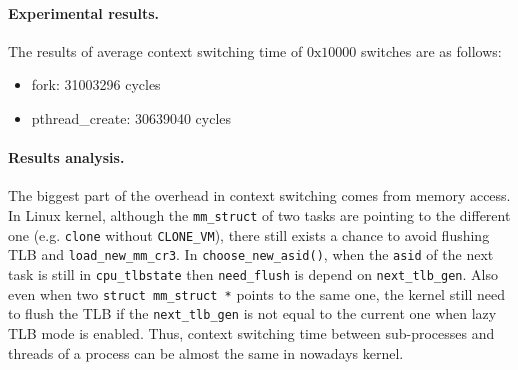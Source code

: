 \paragraph{Experimental results.}
The results of average context switching time of $0\text{x}10000$ switches are as follows:
\begin{itemize}[leftmargin=*]
	\item fork: 31003296 cycles
	\item pthread\_create: 30639040 cycles
\end{itemize}

\paragraph{Results analysis.} The biggest part of the overhead in context switching comes from memory access. In Linux kernel, although the \texttt{mm\_struct} of two tasks are pointing to the different one (e.g. \texttt{clone} without \texttt{CLONE\_VM}), there still exists a chance to avoid flushing TLB and \texttt{load\_new\_mm\_cr3}. In \texttt{choose\_new\_asid()}, when the \texttt{asid} of the next task is still in \texttt{cpu\_tlbstate} then \texttt{need\_flush} is depend on \texttt{next\_tlb\_gen}. Also even when two \texttt{struct mm\_struct *} points to the same one, the kernel still need to flush the TLB if the \texttt{next\_tlb\_gen} is not equal to the current one when lazy TLB mode is enabled. Thus, context switching time between sub-processes and threads of a process can be almost the same in nowadays kernel.
